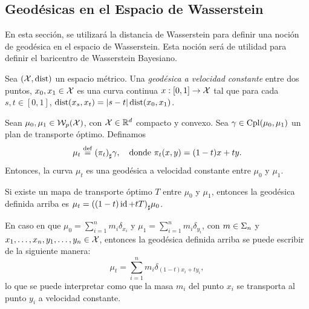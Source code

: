 {{	  \subsection{Geodésicas en el Espacio de Wasserstein}\label{ssec:geodesicas-Wasserstein}
	  {
		  En esta sección, se utilizará la distancia de Wasserstein para definir una noción de geodésica en el espacio de Wasserstein. Esta noción será de utilidad para definir el baricentro de Wasserstein Bayesiano.
		  \begin{definition}
			  Sea $(\cX, \dist)$ un espacio métrico. Una \emph{geodésica a velocidad constante}  entre dos puntos, $x_0, x_1 \in \cX$ es una curva continua $x : [0, 1] \to \cX$  tal que para cada $s, t \in [0, 1]$, $\dist(x_s,x_t) = |s - t| \dist(x_0,x_1) $.
		  \end{definition}

		  \begin{proposition}
			  Sean $\mu_0, \mu_1 \in \WassersteinSpace[p]{\cX} $, con $\cX \in \R^d$  compacto y convexo. Sea $\gamma \in \Cpl(\mu_0, \mu_1)$  un plan de transporte óptimo. Definamos
			  \begin{equation}
				  \mu_t \eqdef \pf{(\pi_t)} \gamma, \quad \text{donde } \pi_t(x, y) = (1-t)x + ty.
			  \end{equation}
			  Entonces, la curva $\mu_t$ es una geodésica a velocidad constante entre $\mu_0$ y $\mu_1$.

		  \end{proposition}

		  \begin{example}
			  Si existe un mapa de transporte óptimo $T$ entre $\mu_0$ y $\mu_1$, entonces la geodésica definida arriba es $\mu_t = \pf{((1-t)\id + tT)} \mu_0$.
		  \end{example}

		  \begin{remark}
			  En caso en que $\mu_0 = \sum_{i=1}^{n} m_i \delta_{x_i}$ y $\mu_1 = \sum_{i=1}^{n} m_i \delta_{y_i}$, con $m\in\Simplex[n]$ y $x_1,\ldots, x_n, y_1,\ldots, y_n \in \cX$, entonces la geodésica definida arriba se puede escribir de la siguiente manera:
			  \begin{equation}
				  \mu_t = \sum_{i=1}^{n} m_i \delta_{(1-t)x_i + ty_i},
			  \end{equation}
			  lo que se puede interpretar como que la masa $m_i$ del punto $x_i$ se transporta al punto $y_i$ a velocidad constante.
		  \end{remark}




}}}
